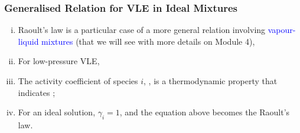 \documentclass[10pt,compress,handout,ignorenonframetext,unknownkeysallowed]{beamer}
\begin{document}
\begin{frame}
  \frametitle{Generalised Relation for VLE in Ideal Mixtures}
  \begin{enumerate}[i)]
      \item<1-> Raoult's law is a particular case of a more general relation involving \textcolor{blue}{vapour-liquid mixtures} (that we will see with more details on Module 4),
      \item<3-> For low-pressure VLE,
      \item<4-> The activity  coefficient of species $i$, , is a thermodynamic property that indicates ;
      \item<4-> For an ideal solution, $\gamma_{i}=1$, and the equation above becomes the Raoult's law.  
  \end{enumerate}
\end{frame}
\end{document}
